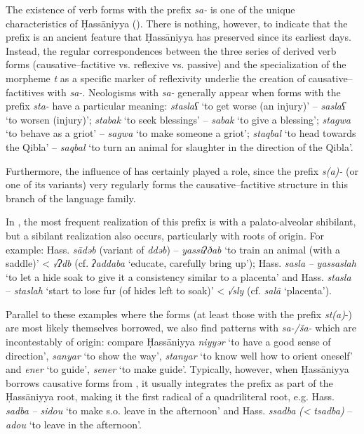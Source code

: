 \documentclass[output=paper]{langsci/langscibook}
\begin{document}
The existence of verb forms with the prefix \textit{sa-} is one of the unique characteristics of Ḥassāniyya (\citealt{Cohen1963,Taine-Cheikh2003}). There is nothing, however, to indicate that the prefix is an ancient  feature that Ḥassāniyya has preserved since its earliest days. Instead, the regular correspondences between the three series of derived verb forms (causative--factitive vs. reflexive vs. {passive}) and the specialization of the morpheme \textit{t} as a specific marker of reflexivity underlie the creation of causative--factitives with \textit{sa-}. Neologisms with \textit{sa-} generally appear when forms with the prefix \textit{sta-} have a particular meaning: \textit{staslaʕ} ‘to get worse (an injury)’ – \textit{saslaʕ} ‘to worsen (injury)’; \textit{stab{\R}ak} ‘to seek blessings’ – \textit{sab{\R}ak} ‘to give a blessing’; \textit{stagwa} ‘to behave as a griot’ – \textit{sagwa} ‘to make someone a griot’; \textit{staqbal} ‘to head towards the Qibla’ – \textit{saqbal} ‘to turn an animal for slaughter in the direction of the Qibla’. 

Furthermore, the influence of  has certainly played a role, since the prefix \textit{s(a)-} (or one of its variants) very regularly forms the causative--factitive structure in this branch of the  language family. 

In , the most frequent realization of this prefix is with a palato-alveolar shibilant, but a {sibilant} realization also occurs, particularly with {roots} of  origin. For example: Hass. \textit{sādəb} (variant of \textit{ddəb}) –  \textit{yassiʔðab} ‘to train an animal (with a saddle)’ <  \textit{√ʔdb} (cf. \textit{ʔaddaba} ‘educate, carefully bring up’); Hass. \textit{sasla} \textit{–}  \textit{yassaslah} ‘to let a hide soak to give it a consistency similar to a placenta’ and Hass. \textit{stasla} –  \textit{staslah} ‘start to lose fur (of hides left to soak)’ <  \textit{√sly} (cf. \textit{salā} ‘placenta’).

Parallel to these examples where the  forms (at least those with the prefix \textit{st(a)}{}-) are most likely themselves borrowed, we also find patterns with \textit{sa-/ša-} which are incontestably of  origin: compare Ḥassāniyya \textit{niyyər} ‘to have a good sense of direction’, \textit{sanyar} ‘to show the way’, \textit{stanyar} ‘to know well how to orient oneself’ and  \textit{ener} ‘to guide’, \textit{sener} ‘to make guide’. Typically, however, when Ḥassāniyya borrows {causative} forms from , it usually integrates the  prefix as part of the Ḥassāniyya {root}, making it the first radical of a quadriliteral {root}, e.g. Hass. \textit{sadba} \textit{–}  \textit{sidou} ‘to make s.o. leave in the afternoon’ and Hass. \textit{ssadba} \textit{(<} \textit{tsadba)} –  \textit{adou} ‘to leave in the afternoon’. 
\end{document}
